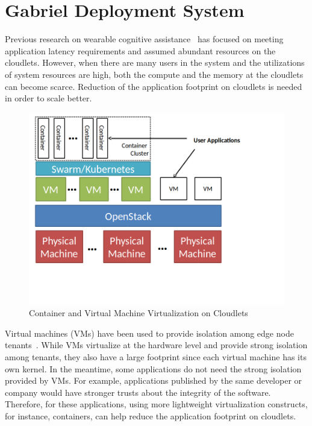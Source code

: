 \section{Gabriel Deployment System}

Previous research on wearable cognitive assistance~\cite{chen2017empirical} has
focused on meeting application latency requirements and assumed abundant
resources on the cloudlets. However, when there are many users in the system
and the utilizations of system resources are high, both the compute and the
memory at the cloudlets can become scarce. Reduction of the application
footprint on cloudlets is needed in order to scale better.

\begin{figure}[h]
  \centering
  \includegraphics[trim={0 1.5in 0 0},clip,width=5in]{FIGS/cloudlet-gateway}
  \caption{Container and Virtual Machine Virtualization on Cloudlets}
  \label{fig:cloudlet-gateway}
  \end{figure}

Virtual machines (VMs) have been used to provide isolation among edge node
tenants~\cite{ha2014towards}. While VMs virtualize at the hardware level and
provide strong isolation among tenants, they also have a large footprint since
each virtual machine has its own kernel. In the meantime, some applications do
not need the strong isolation provided by VMs. For example, applications
published by the same developer or company would have stronger trusts about the
integrity of the software. Therefore, for these applications, using more
lightweight virtualization constructs, for instance, containers, can help reduce
the application footprint on cloudlets.

